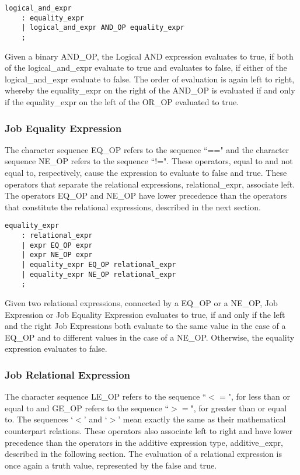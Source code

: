 \documentclass[prodmode,acmtecs]{acmsmall}
\begin{document}
\begin{lstlisting}
logical_and_expr
	: equality_expr
	| logical_and_expr AND_OP equality_expr
	;
\end{lstlisting}

Given a binary AND\_OP, the Logical AND expression evaluates to true,
if both of the logical\_and\_expr evaluate to true and evaluates to false,
if either of the logical\_and\_expr evaluate to false. 
The order of evaluation is again left to right, whereby the 
equality\_expr on the right of the AND\_OP is evaluated if and only 
if the equality\_expr on the left of the OR\_OP evaluated to true.
\medskip

\subsubsection{Job Equality Expression}

The character sequence EQ\_OP refers to the sequence ``==" and the 
character sequence NE\_OP refers to the sequence ``!=". These operators, 
equal to and not equal to, respectively, cause the expression to 
evaluate to false and true.  These operators that separate the
relational expressions, relational\_expr, associate left. The
operators EQ\_OP and NE\_OP have lower precedence than the 
operators that constitute the relational expressions, described in the 
next section. 

\begin{lstlisting}
equality_expr
	: relational_expr
	| expr EQ_OP expr
	| expr NE_OP expr
	| equality_expr EQ_OP relational_expr
	| equality_expr NE_OP relational_expr
	;
\end{lstlisting}

Given two relational expressions, connected by a EQ\_OP or a NE\_OP, 
Job Expression or Job Equality Expression evaluates to true, 
if and only if the left and the right Job Expressions both evaluate
to the same value in the case of a EQ\_OP and to different values in
the case of a NE\_OP.  Otherwise, the equality expression evaluates
to false.
\medskip

\subsubsection{Job Relational Expression}

The character sequence LE\_OP refers to the sequence ``$<=$", for less 
than or equal to and GE\_OP refers to the sequence ``$>=$", for greater 
than or equal to. The sequences `$<$' and `$>$' mean exactly the same as 
their mathematical counterpart relations. These operators also associate 
left to right and have lower precedence than the operators in the additive 
expression type, additive\_expr, described in the following section. The 
evaluation of a relational expression is once again a truth value, 
represented by the false and true. 
\end{document}

